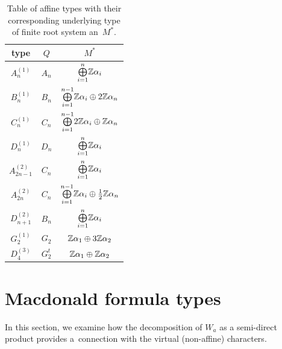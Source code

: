\documentclass[10pt,a4paper]{amsart}
\numberwithin{equation}{section}
\begin{document}
\begin{table}[th]\centering\renewcommand{\arraystretch}{1.32}
\caption{Table of affine types with their corresponding underlying type of finite root system an~$M^{\ast}$.}\label{table2}
\begin{tabular}{|c|c|c|}
\hline
type & $Q$ & $M^{\ast }$ \\ \hline
$A_{n}^{(1)}$ & $A_{n}$ & ${\textstyle\bigoplus\limits_{i=1}^{n}}\mathbb{%
	Z\alpha }_{i}$ \\ \hline
$B_{n}^{(1)}$ & $B_{n}$ & ${\textstyle\bigoplus\limits_{i=1}^{n-1}}\mathbb{%
	Z\alpha }_{i}\oplus 2\mathbb{Z}\alpha _{n}$ \\ \hline
$C_{n}^{(1)}$ & $C_{n}$ & ${\textstyle\bigoplus\limits_{i=1}^{n-1}}2\mathbb{%
	Z\alpha }_{i}\oplus \mathbb{Z}\alpha _{n}$ \\ \hline
$D_{n}^{(1)}$ & $D_{n}$ & ${\textstyle\bigoplus\limits_{i=1}^{n}}\mathbb{%
	Z\alpha }_{i}$ \\ \hline
$A_{2n-1}^{(2)}$ & $C_{n}$ & ${\textstyle\bigoplus\limits_{i=1}^{n}}\mathbb{%
	Z\alpha }_{i}$ \\ \hline
$A_{2n}^{(2)}$ & $C_{n}$ & ${\textstyle\bigoplus\limits_{i=1}^{n-1}}\mathbb{%
	Z\alpha }_{i}\oplus \frac{1}{2}\mathbb{Z}\alpha _{n}$ \\ \hline
$D_{n+1}^{(2)}$ & $B_{n}$ & ${\textstyle\bigoplus\limits_{i=1}^{n}}\mathbb{%
	Z\alpha }_{i}$ \\ \hline
$G_{2}^{(1)}$ & $G_{2}$ & ${\textstyle}\mathbb{Z\alpha }_{1}\oplus 3\mathbb{%
	Z\alpha }_{2}$ \\ \hline
$D_{4}^{(3)}$ & $G_{2}^{t}$ & ${\textstyle}\mathbb{Z\alpha }_{1}\oplus
\mathbb{Z\alpha }_{2}$ \\ \hline
\end{tabular}
\end{table}

\section{Macdonald formula types}\label{sec:3}

In this section, we examine how the decomposition of $W_a$ as a semi-direct product provides a~connection with the virtual (non-affine) characters.
\end{document}
